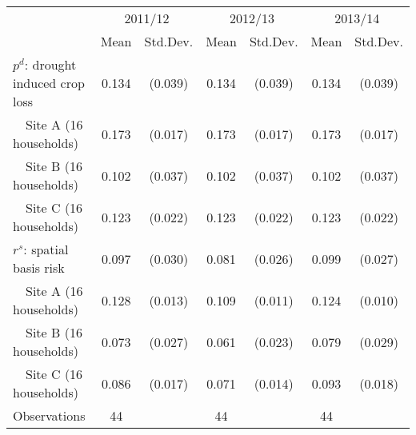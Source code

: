 {
\def\sym#1{\ifmmode^{#1}\else\(^{#1}\)\fi}
\begin{tabular}{l*{3}{cc}}
\hline\hline
                    &\multicolumn{2}{c}{2011/12}&\multicolumn{2}{c}{2012/13}&\multicolumn{2}{c}{2013/14}\\\cmidrule(lr){2-3}\cmidrule(lr){4-5}\cmidrule(lr){6-7}
                    &        Mean&    Std.Dev.&        Mean&    Std.Dev.&        Mean&    Std.Dev.\\
\hline
$p^d$: drought induced crop loss&       0.134&     (0.039)&       0.134&     (0.039)&       0.134&     (0.039)\\
~~Site A (16 households)&       0.173&     (0.017)&       0.173&     (0.017)&       0.173&     (0.017)\\
~~Site B (16 households)&       0.102&     (0.037)&       0.102&     (0.037)&       0.102&     (0.037)\\
~~Site C (16 households)&       0.123&     (0.022)&       0.123&     (0.022)&       0.123&     (0.022)\\
$r^s$: spatial basis risk&       0.097&     (0.030)&       0.081&     (0.026)&       0.099&     (0.027)\\
~~Site A (16 households)&       0.128&     (0.013)&       0.109&     (0.011)&       0.124&     (0.010)\\
~~Site B (16 households)&       0.073&     (0.027)&       0.061&     (0.023)&       0.079&     (0.029)\\
~~Site C (16 households)&       0.086&     (0.017)&       0.071&     (0.014)&       0.093&     (0.018)\\
\hline
Observations        &          44&            &          44&            &          44&            \\
\hline\hline
\end{tabular}
}
